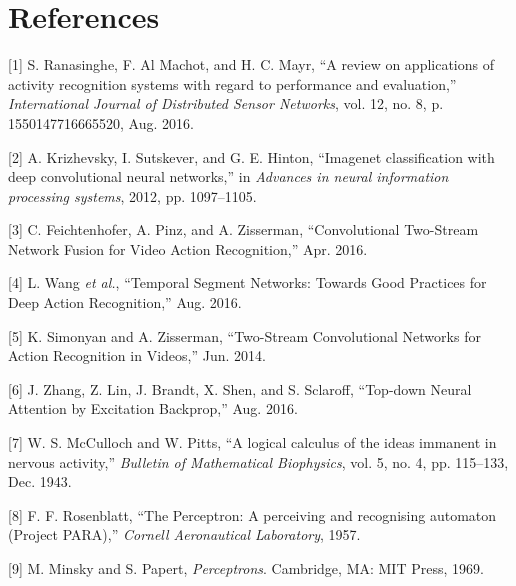 \documentclass[A4paper,draft]{scrreprt}
\begin{document}
\chapter*{References}\label{references}

\hypertarget{refs}{}
\hypertarget{ref-ranasinghe2016_reviewapplicationsactivity}{}
{[}1{]} S. Ranasinghe, F. Al Machot, and H. C. Mayr, ``A review on
applications of activity recognition systems with regard to performance
and evaluation,'' \emph{International Journal of Distributed Sensor
Networks}, vol. 12, no. 8, p. 1550147716665520, Aug. 2016.

\hypertarget{ref-krizhevsky2012_Imagenetclassificationdeep}{}
{[}2{]} A. Krizhevsky, I. Sutskever, and G. E. Hinton, ``Imagenet
classification with deep convolutional neural networks,'' in
\emph{Advances in neural information processing systems}, 2012, pp.
1097--1105.

\hypertarget{ref-feichtenhofer2016_ConvolutionalTwoStreamNetwork}{}
{[}3{]} C. Feichtenhofer, A. Pinz, and A. Zisserman, ``Convolutional
Two-Stream Network Fusion for Video Action Recognition,'' Apr. 2016.

\hypertarget{ref-wang2016_TemporalSegmentNetworks}{}
{[}4{]} L. Wang \emph{et al.}, ``Temporal Segment Networks: Towards Good
Practices for Deep Action Recognition,'' Aug. 2016.

\hypertarget{ref-simonyan2014_TwoStreamConvolutionalNetworks}{}
{[}5{]} K. Simonyan and A. Zisserman, ``Two-Stream Convolutional
Networks for Action Recognition in Videos,'' Jun. 2014.

\hypertarget{ref-zhang2016_TopdownNeuralAttention}{}
{[}6{]} J. Zhang, Z. Lin, J. Brandt, X. Shen, and S. Sclaroff,
``Top-down Neural Attention by Excitation Backprop,'' Aug. 2016.

\hypertarget{ref-mcculloch1943_logicalcalculusideas}{}
{[}7{]} W. S. McCulloch and W. Pitts, ``A logical calculus of the ideas
immanent in nervous activity,'' \emph{Bulletin of Mathematical
Biophysics}, vol. 5, no. 4, pp. 115--133, Dec. 1943.

\hypertarget{ref-rosenblatt1957_Perceptronperceivingrecognising}{}
{[}8{]} F. F. Rosenblatt, ``The Perceptron: A perceiving and recognising
automaton (Project PARA),'' \emph{Cornell Aeronautical Laboratory},
1957.

\hypertarget{ref-minsky1969_Perceptrons}{}
{[}9{]} M. Minsky and S. Papert, \emph{Perceptrons}. Cambridge, MA: MIT
Press, 1969.
\end{document}
